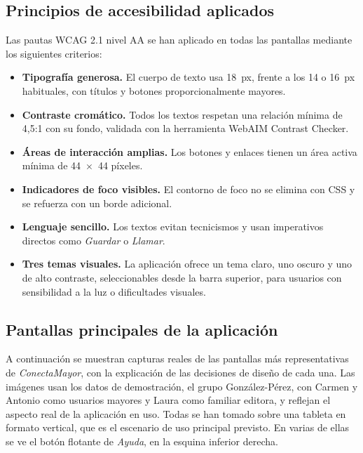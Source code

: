 \subsection{Principios de accesibilidad
aplicados\label{SUB:DIS_WCAG}}

Las pautas WCAG 2.1 nivel AA se han aplicado en todas las pantallas mediante los siguientes criterios:

\begin{itemize}
  \item \textbf{Tipografía generosa.} El cuerpo de texto usa 18~px, frente
  a los 14 o 16~px habituales, con títulos y botones proporcionalmente
  mayores.
  \item \textbf{Contraste cromático.} Todos los textos respetan una
  relación mínima de 4{,}5:1 con su fondo, validada con la herramienta
  WebAIM Contrast Checker.
  \item \textbf{Áreas de interacción amplias.} Los botones y enlaces tienen
  un área activa mínima de 44~$\times$~44 píxeles.
  \item \textbf{Indicadores de foco visibles.} El contorno de foco no se
  elimina con CSS y se refuerza con un borde adicional.
  \item \textbf{Lenguaje sencillo.} Los textos evitan tecnicismos y usan
  imperativos directos como \emph{Guardar} o \emph{Llamar}.
  \item \textbf{Tres temas visuales.} La aplicación ofrece un tema claro,
  uno oscuro y uno de alto contraste, seleccionables desde la barra
  superior, para usuarios con sensibilidad a la luz o dificultades
  visuales.
\end{itemize}


\subsection{Pantallas principales de la
aplicación\label{SUB:DIS_PROTOTIPO}}

A continuación se muestran capturas reales de las pantallas más
representativas de \emph{ConectaMayor}, con la explicación de las
decisiones de diseño de cada una. Las imágenes usan los datos de
demostración, el grupo González-Pérez, con Carmen y Antonio como usuarios
mayores y Laura como familiar editora, y reflejan el aspecto real de la
aplicación en uso. Todas se han tomado sobre una tableta en formato
vertical, que es el escenario de uso principal previsto. En varias de
ellas se ve el botón flotante de \emph{Ayuda}, en la esquina inferior
derecha.

